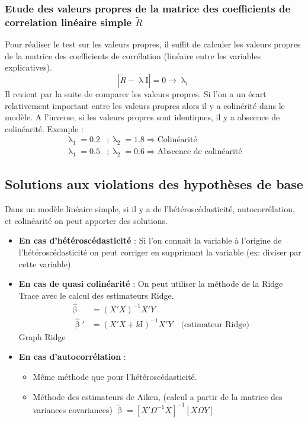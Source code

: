 \documentclass{article}
\begin{document}
\subsubsection{Etude des valeurs propres de la matrice des coefficients de correlation
linéaire simple $\tilde{R}$}
Pour réaliser le test sur les valeurs propres, il suffit de calculer les valeurs propres de la matrice des coefficients de corrélation (linéaire entre les variables explicatives).
\begin{equation*}
		\left| \tilde{R} - \uplambda \text{I} \right| = 0 \to \uplambda_i
\end{equation*}
Il revient par la suite de comparer les valeurs propres. Si l'on a un écart relativement important entre les valeurs propres alors il y a colinérité dans le modèle. A l'inverse, si les valeurs
propres sont identiques, il y a abscence de colinéarité. Exemple :
\begin{equation*}
\begin{split}
		\uplambda_1 = 0.2 &; \uplambda_2 = 1.8 \Rightarrow \text{Colinéarité} \\
		\uplambda_1 = 0.5 &; \uplambda_2 = 0.6 \Rightarrow \text{Abscence de colinéarité}
\end{split}
\end{equation*}
\subsection{Solutions aux violations des hypothèses de base}
Dans un modèle linéaire simple, si il y a de l'hétéroscédasticité, autocorrélation, et colinéarité on peut apporter des solutions.
\begin{itemize}
		\item \textbf{En cas d'hétéroscédasticité} : Si l'on connait la variable à l'origine de l'hétéroscédasticité on peut corriger en supprimant la variable (ex: diviser par cette variable)
		\item \textbf{En cas de quasi colinéarité} : On peut utiliser la méthode de la Ridge Trace avec le calcul des estimateurs Ridge.
			\begin{equation*}
			\begin{split}
					\hat{\upbeta} &= \left( X' X \right)^{-1} X'Y \\
					\hat{\upbeta}' &= \left( X'X + k \text{I} \right)^{-1} X' Y \quad \text{(estimateur Ridge)}
			\end{split}
			\end{equation*}
			Graph Ridge
		\item \textbf{En cas d'autocorrélation} :
			\begin{itemize}
					\item Même méthode que pour l'hétéroscédasticité.
					\item Méthode des estimateurs de Aiken, (calcul a partir de la matrice des variances covariances) $\tilde{\upbeta} = \left[ X' \Omega^{-1} X \right]^{-1} \left[ X \Omega Y \right]  $
			\end{itemize}
\end{itemize}
\end{document}
